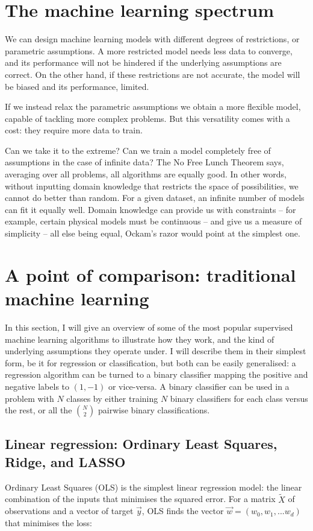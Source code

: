 \section{The machine learning spectrum}
We can design machine learning models with different degrees of restrictions, or parametric assumptions.
A more restricted model needs less data to converge, and its performance will not be hindered if the underlying assumptions are correct.
On the other hand, if these restrictions are not accurate, the model will be biased and its performance, limited.

If we instead relax the parametric assumptions we obtain a more flexible model, capable of tackling more complex problems.
But this versatility comes with a cost: they require more data to train.

Can we take it to the extreme?
Can we train a model completely free  of assumptions in the case of infinite data? The No Free Lunch Theorem \citep{no_free_lunch} says, averaging over all problems, all algorithms are equally good.
In other words, without inputting domain knowledge that restricts the space of possibilities, we cannot do better than random.
For a given dataset, an infinite number of models can fit it equally well.
Domain knowledge can provide us with constraints -- for example, certain physical models must be continuous -- and give us a measure of simplicity -- all else being equal, Ockam's razor would point at the simplest one.

\section[Traditional machine learning]{A point of comparison: traditional machine learning}
In this section, I will give an overview of some of the most popular supervised machine learning algorithms to illustrate how they work, and the kind of underlying assumptions they operate under.
I will describe them in their simplest form, be it for regression or classification, but both can be easily generalised: a regression algorithm can be turned to a binary classifier mapping the positive and negative labels to $(1, -1)$ or vice-versa.
A binary classifier can be used in a problem with $N$ classes by either training $N$ binary classifiers for each class versus the rest, or all the $\binom{N}{2}$ pairwise binary classifications.

\subsection[Linear regression]{Linear regression: Ordinary Least Squares, Ridge, and LASSO}\label{sec:linear}
Ordinary Least Squares (OLS) is the simplest linear regression model: the linear combination of the inputs that minimises the squared error.
For a matrix $ \widetilde X$ of observations and a vector of target $\vec y$, OLS finds the vector $\vec w = (w_0, w_1, ... w_d)$ that minimises the loss:


